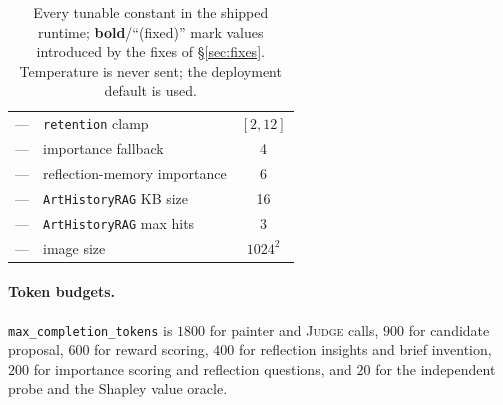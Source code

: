 \documentclass[11pt]{article}
\newcommand{\code}[1]{\texttt{\small #1}}
\newcommand{\JUDGE}{\textsc{Judge}}
\theoremstyle{plain}
\theoremstyle{definition}
\begin{document}
\begin{table}[!ht]
{\begin{tabular}{@{}llc@{}}
---                       & \code{retention} clamp        & $[2,12]$\\
---                       & importance fallback           & 4\\
---                       & reflection-memory importance  & 6\\
---                       & \code{ArtHistoryRAG} KB size  & 16\\
---                       & \code{ArtHistoryRAG} max hits & 3\\
---                       & image size                    & $1024^2$\\
\bottomrule
\end{tabular}}
\caption{Every tunable constant in the shipped runtime; \textbf{bold}/``(fixed)''
mark values introduced by the fixes of \S\ref{sec:fixes}. Temperature is never
sent; the deployment default is used.}
\end{table}

\paragraph{Token budgets.}
\code{max\_completion\_tokens} is $1800$ for painter and \JUDGE{} calls, $900$
for candidate proposal, $600$ for reward scoring, $400$ for reflection insights
and brief invention, $200$ for importance scoring and reflection questions, and
$20$ for the independent probe and the Shapley value oracle.

\end{document}

